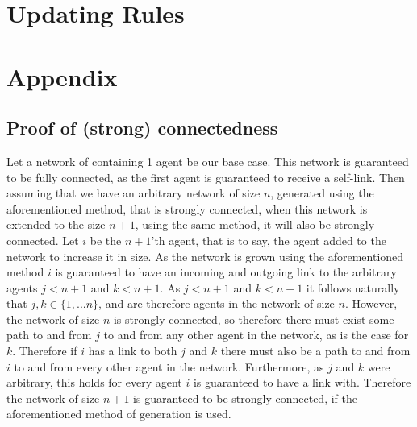 \documentclass{article}
\begin{document}
\section{Updating Rules}
\newpage
\section{Appendix}
\subsection{Proof of (strong) connectedness}
Let a network of containing 1 agent be our base case. This network is guaranteed to be fully connected, as the first agent is guaranteed to receive a self-link. Then assuming that we have an arbitrary network of size $n$, generated using the aforementioned method, that is strongly connected, when this network is extended to the size $n+1$, using the same method, it will also be strongly connected. Let $i$ be the $n+1$'th agent, that is to say, the agent added to the network to increase it in size. As the network is grown using the aforementioned method $i$ is guaranteed to have an incoming and outgoing link to the arbitrary agents $j < n+1$ and $k < n+1$. As $j < n+1$ and $k < n+1$ it follows naturally that $j, k \in \{1, ... n\}$, and are therefore agents in the network of size $n$. However, the network of size $n$ is strongly connected, so therefore there must exist some path to and from $j$ to and from any other agent in the network, as is the case for $k$. Therefore if $i$ has a link to both $j$ and $k$ there must also be a path to and from $i$ to and from every other agent in the network. Furthermore, as $j$ and $k$ were arbitrary, this holds for every agent $i$ is guaranteed to have a link with. Therefore the network of size $n+1$ is guaranteed to be strongly connected, if the aforementioned method of generation is used.\newline

\newpage
\end{document}

